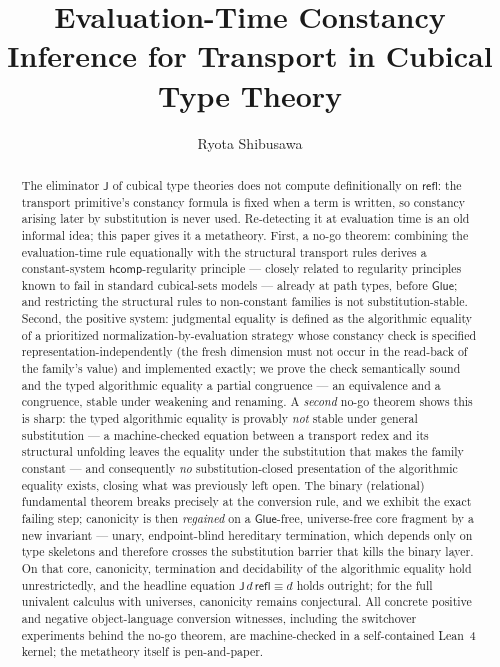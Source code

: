 \documentclass{lmcs}
\newcommand{\hcomp}{\mathsf{hcomp}}
\newcommand{\refl}{\mathsf{refl}}
\newcommand{\J}{\mathsf{J}}
\newcommand{\Glue}{\mathsf{Glue}}
\renewcommand{\conv}{\equiv}
\begin{document}
\title[Evaluation-Time Constancy Inference]{Evaluation-Time Constancy
  Inference for Transport in Cubical Type Theory}

\author[R.~Shibusawa]{Ryota Shibusawa}
\address{Daiichi Institute of Technology, Japan}




\begin{abstract}
  The eliminator $\J$ of cubical type theories does not compute
  definitionally on $\refl$: the transport primitive's constancy
  formula is fixed when a term is written, so constancy arising later
  by substitution is never used.  Re-detecting it at evaluation time
  is an old informal idea; this paper gives it a metatheory.  First,
  a no-go theorem: combining the evaluation-time rule equationally
  with the structural transport rules derives a constant-system
  $\hcomp$-regularity principle --- closely related to regularity
  principles known to fail in standard cubical-sets models ---
  already at path types, before $\Glue$; and restricting the
  structural rules to non-constant families is not
  substitution-stable.  Second, the positive system: judgmental
  equality is defined as the algorithmic equality of a prioritized
  normalization-by-evaluation strategy whose constancy check is
  specified representation-independently (the fresh dimension must
  not occur in the read-back of the family's value) and implemented
  exactly; we prove the check semantically sound and the typed
  algorithmic equality a partial congruence --- an equivalence and a
  congruence, stable under weakening and renaming.  A \emph{second}
  no-go theorem shows this is sharp: the typed algorithmic equality
  is provably \emph{not} stable under general substitution --- a
  machine-checked equation between a transport redex and its
  structural unfolding leaves the equality under the substitution
  that makes the family constant --- and consequently \emph{no}
  substitution-closed presentation of the algorithmic equality
  exists, closing what was previously left open.  The binary
  (relational) fundamental theorem breaks precisely at the
  conversion rule, and we exhibit the exact failing step; canonicity
  is then \emph{regained} on a $\Glue$-free, universe-free core
  fragment by a new invariant --- unary, endpoint-blind hereditary
  termination, which depends only on type skeletons and therefore
  crosses the substitution barrier that kills the binary layer.  On
  that core, canonicity, termination and decidability of the
  algorithmic equality hold unrestrictedly, and the headline
  equation $\J\,d\,\refl \conv d$ holds outright; for the full
  univalent calculus with universes, canonicity remains
  conjectural.  All concrete positive and negative
  object-language conversion witnesses, including the switchover
  experiments behind the no-go theorem, are machine-checked in a
  self-contained Lean~4 kernel; the metatheory itself is
  pen-and-paper.
\end{abstract}
\end{document}
